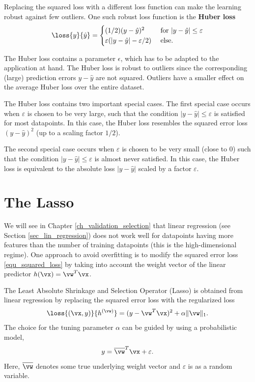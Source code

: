 \documentclass[12pt]{report}
\begin{document}
Replacing the squared loss with a different loss function can 
make the learning robust against few outliers. One such robust 
loss function is the {\bf Huber loss} \cite{HuberRobustBook}
\begin{equation}
\loss{y}{\hat{y}} = \begin{cases} (1/2) (y-\hat{y})^{2} & \mbox{ for } |y-\hat{y}| \leq   \varepsilon \\ 
\varepsilon(|y-\hat{y}| - \varepsilon/2) & \mbox{ else. }\end{cases}
\end{equation}

The Huber loss contains a parameter $\epsilon$, which has to 
be adapted to the application at hand. The Huber loss is robust 
to outliers since the corresponding (large) prediction errors 
$y - \hat{y}$ are not squared. Outliers have a smaller effect 
on the average Huber loss over the entire dataset. 

The Huber loss contains two important special cases. 
The first special case occurs when $\varepsilon$ 
is chosen to be very large, such that the condition 
$|y-\hat{y}| \leq \varepsilon$ is satisfied for most 
datapoints. In this case, the Huber loss resembles 
the squared error loss $(y-\hat{y})^{2}$ (up to a scaling factor $1/2$). 

The second special case occurs when $\varepsilon$ is chosen 
to be very small (close to $0$) such that the condition $|y-\hat{y}| \leq \varepsilon$ 
is almost never satisfied. In this case, the Huber loss is equivalent 
to the absolute loss $|y - \hat{y}|$ scaled by a factor $\varepsilon$.

\section{The Lasso}
\label{sec_lasso}
We will see in Chapter \ref{ch_validation_selection} that linear 
regression (see Section \ref{sec_lin_regression}) does not work 
well for datapoints having more features than the number of 
training datapoints (this is the high-dimensional regime). 
One approach to avoid overfitting is to modify the squared error 
loss \eqref{equ_squared_loss} by taking into account the weight 
vector of the linear predictor $h(\vx) = \vw^{T}\vx$. 

The Least Absolute Shrinkage and Selection Operator (Lasso) is 
obtained from linear regression by replacing the squared error loss 
with the regularized loss 
\begin{equation}
\loss{(\vx,y)}{h^{(\vw)}} = (y-\vw^{T}\vx)^{2} + \alpha \| \vw \|_{1}. 
\end{equation}
The choice for the tuning parameter $\alpha$ can be guided 
by using a probabilistic model, 
$$ y = \overline{\vw}^{T} \vx + \varepsilon.$$ 
Here, $\overline{\vw}$ denotes some true underlying weight vector 
and $\varepsilon$ is as a random variable. 
\end{document}
